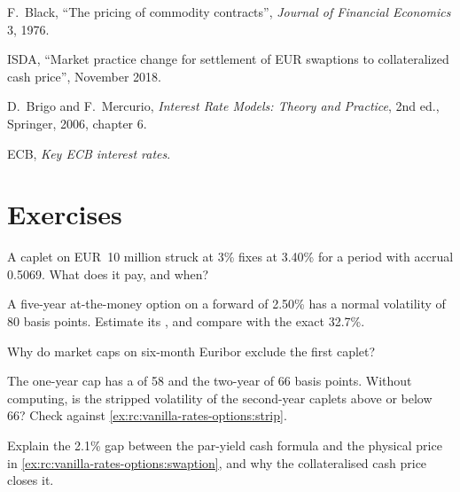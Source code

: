 \begin{omsources}
\item F.\ Black, ``The pricing of commodity contracts'', \emph{Journal of
Financial Economics} 3, 1976.
\item ISDA, ``Market practice change for settlement of EUR swaptions to
collateralized cash price'', November 2018.
\item D.\ Brigo and F.\ Mercurio, \emph{Interest Rate Models: Theory and
Practice}, 2nd ed., Springer, 2006, chapter 6.
\item ECB, \emph{Key ECB interest rates}.
\end{omsources}

\section{Exercises}

\begin{exercise}[$\star$]\label{exo:rc:vanilla-rates-options:1}
A caplet on EUR~10 million struck at 3\% fixes at 3.40\% for a period with
accrual 0.5069. What does it pay, and when?
\end{exercise}

\begin{exercise}[$\star$]\label{exo:rc:vanilla-rates-options:2}
A five-year at-the-money option on a forward of 2.50\% has a normal volatility
of 80 basis points. Estimate its , and compare with the exact
32.7\%.
\end{exercise}

\begin{exercise}[$\star$]\label{exo:rc:vanilla-rates-options:3}
Why do market caps on six-month Euribor exclude the first caplet?
\end{exercise}

\begin{exercise}[$\star\star$]\label{exo:rc:vanilla-rates-options:4}
The one-year cap has a  of 58 and the two-year of 66 basis
points. Without computing, is the stripped volatility of the second-year caplets
above or below 66? Check against \cref{ex:rc:vanilla-rates-options:strip}.
\end{exercise}

\begin{exercise}[$\star\star$]\label{exo:rc:vanilla-rates-options:5}
Explain the 2.1\% gap between the par-yield cash formula and the physical price
in \cref{ex:rc:vanilla-rates-options:swaption}, and why the collateralised cash
price closes it.
\end{exercise}

